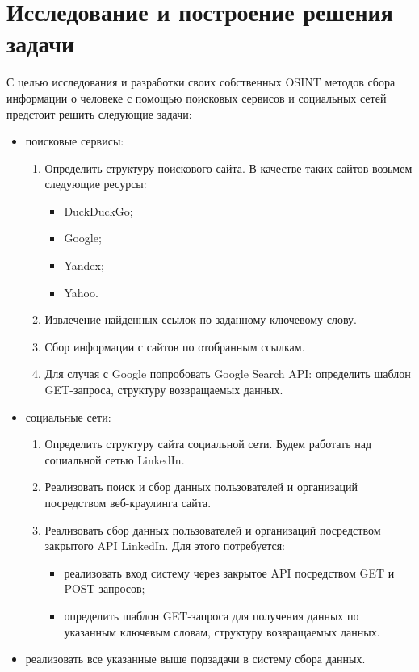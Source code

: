 \section{Исследование и построение решения задачи}
\label{sec:Chapter3} 
С целью исследования и разработки своих собственных OSINT методов сбора информации о человеке с помощью поисковых сервисов и 
социальных сетей предстоит решить следующие задачи:
\begin{itemize}
    \item поисковые сервисы:
    \begin{enumerate}
        \item Определить структуру поискового сайта. В качестве таких сайтов возьмем следующие ресурсы:
        \begin{itemize}
            \item DuckDuckGo;
            \item Google;
            \item Yandex;
            \item Yahoo.
        \end{itemize}
        \item Извлечение найденных ссылок по заданному ключевому слову.
        \item Сбор информации с сайтов по отобранным ссылкам.
        \item Для случая с Google попробовать Google Search API: определить шаблон GET-запроса, структуру возвращаемых данных.
    \end{enumerate}
    \item социальные сети:
    \begin{enumerate}
        \item Определить структуру сайта социальной сети. Будем работать над социальной сетью LinkedIn.
        \item Реализовать поиск и сбор данных пользователей и организаций посредством веб-краулинга сайта.
        \item Реализовать сбор данных пользователей и организаций посредством закрытого API LinkedIn. Для этого потребуется:
        \begin{itemize}
            \item реализовать вход систему через закрытое API посредством GET и POST запросов;
            \item определить шаблон GET-запроса для получения данных по указанным ключевым словам, структуру возвращаемых данных.
        \end{itemize}
    \end{enumerate}
    \item реализовать все указанные выше подзадачи в систему сбора данных. 
\end{itemize}
